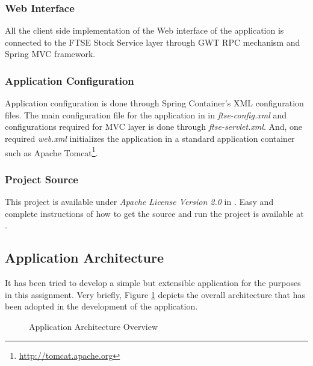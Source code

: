\documentclass{acm_proc_article-sp}
\begin{document}
\subsubsection{Web Interface}
All the client side implementation of the Web interface of the application is connected to the FTSE Stock Service layer
through GWT RPC mechanism and Spring MVC framework.

\subsubsection{Application Configuration}
Application configuration is done through Spring Container's XML configuration files. The main configuration file for
the application in in \textit{ftse-config.xml} and configurations required for MVC layer is done through
\textit{ftse-servlet.xml}. And, one required \textit{web.xml} initializes the application in a standard application
container such as Apache Tomcat\footnote{\url{http://tomcat.apache.org}}.

\subsubsection{Project Source}
This project is available under \textit{Apache License Version 2.0} in \cite{ftse}. Easy and complete instructions of
how to get the source and run the project is available at \cite{ftse:wiki}.

\subsection{Application Architecture}
It has been tried to develop a simple but extensible application for the purposes in this assignment. Very briefly,
Figure \ref{fig:apparch} depicts the overall architecture that has been adopted in the development of the application.

\begin{figure}[h]
\centering
\setlength\fboxsep{0.1pt}
\setlength\fboxrule{0.7pt}
\caption{Application Architecture Overview} \label{fig:apparch}
\end{figure}
\end{document}
